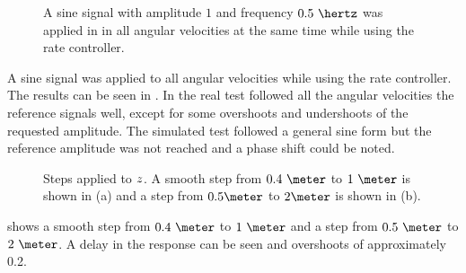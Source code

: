 \begin{figure}
\centering
  \qquad
  \qquad
  \qquad
  \qquad
  \qquad
  \caption{\label{fig:SinAllRate}%
  A sine signal with amplitude $1$ and frequency $0.5\ \hertz$ was applied in in all angular velocities at the same time while using the rate controller.}
\end{figure}

A sine signal was applied to all angular velocities while using the rate controller. The results can be seen in  . In the real test followed all the angular velocities the reference signals well, except for some overshoots and undershoots of the requested amplitude. The simulated test followed a general sine form but the reference amplitude was not reached and a phase shift could be noted.

\begin{figure}[tbp]
  \centering
  \qquad
  \caption{\label{fig:StepD}%
    Steps applied to $z$. A smooth step from $0.4\ \meter$ to $1\ \meter$ is shown in (a) and a step from $0.5 \meter$ to $2 \meter$ is shown in (b).}
\end{figure}

 shows a smooth step from $0.4\ \meter$ to $1\ \meter$ and a step from $0.5\ \meter$ to $2\ \meter$. A delay in the response can be seen and overshoots of approximately 0.2.


